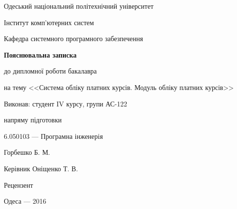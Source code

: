 \documentclass[a4paper,14pt]{article}
\begin{document}

\pagestyle{empty}

\begin{center}
Одеський національний політехнічний університет

Інститут комп'ютерних систем

Кафедра системного програмного забезпечення
\vspace{55mm}

\textbf{Пояснювальна записка}

до дипломної роботи бакалавра

на тему <<Система обліку платних курсів. Модуль обліку платних курсів>>
\end{center}
\vspace{4cm}
\begin{flushleft}
Виконав: студент IV курсу, групи АС-122

напряму підготовки

6.050103 --- Програмна інженерія

Горбешко Б. М.

Керівник Оніщенко Т. В.

Рецензент
\end{flushleft}
\vspace{45mm}
\begin{center}Одеса --- 2016\end{center}
\newpage

\newpage
\makeatletter\renewcommand{\@oddhead}{\hfil\thepage}\makeatother

\def\contentsname{ЗМІСТ}
\tableofcontents
\newpage










\end{document}
